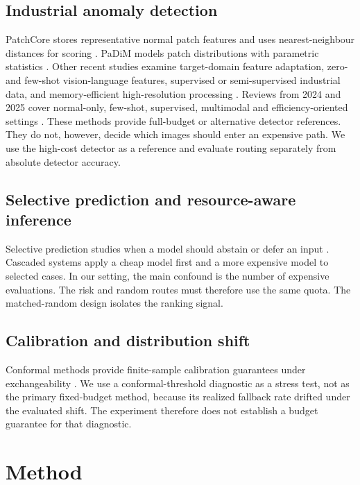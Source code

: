 \documentclass[pdflatex,sn-vancouver-num]{sn-jnl}
\begin{document}
\subsection{Industrial anomaly detection}
PatchCore stores representative normal patch features and uses nearest-neighbour distances for scoring \cite{roth2022patchcore}. PaDiM models patch distributions with parametric statistics \cite{defard2021padim}. Other recent studies examine target-domain feature adaptation, zero- and few-shot vision-language features, supervised or semi-supervised industrial data, and memory-efficient high-resolution processing \cite{liu2023simplenet,jeong2023winclip,baitieva2024segad,rolih2024divide}. Reviews from 2024 and 2025 cover normal-only, few-shot, supervised, multimodal and efficiency-oriented settings \cite{tao2024deepindustrial,li2025survey,mao2025rethinks}. These methods provide full-budget or alternative detector references. They do not, however, decide which images should enter an expensive path. We use the high-cost detector as a reference and evaluate routing separately from absolute detector accuracy.

\subsection{Selective prediction and resource-aware inference}
Selective prediction studies when a model should abstain or defer an input \cite{geifman2017selective}. Cascaded systems apply a cheap model first and a more expensive model to selected cases. In our setting, the main confound is the number of expensive evaluations. The risk and random routes must therefore use the same quota. The matched-random design isolates the ranking signal.

\subsection{Calibration and distribution shift}
Conformal methods provide finite-sample calibration guarantees under exchangeability \cite{vovk2005algorithmic,angelopoulos2023conformal}. We use a conformal-threshold diagnostic as a stress test, not as the primary fixed-budget method, because its realized fallback rate drifted under the evaluated shift. The experiment therefore does not establish a budget guarantee for that diagnostic.

\section{Method}\label{sec:method}
\end{document}
